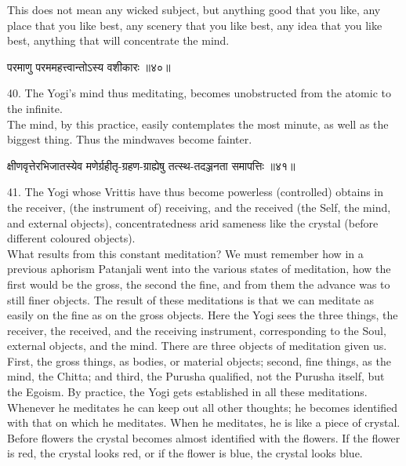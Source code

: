 This does not mean any wicked subject, but anything good that
you like, any place that you like best, any scenery that you like best,
any idea that you like best, anything that will concentrate the mind. \\

\begin{center}
\begin{sanskrit}
परमाणु परममहत्त्वान्तोऽस्य वशीकारः ॥४०॥
\end{sanskrit}
\end{center}
40. The Yogi's mind thus meditating, becomes unobstructed from
the atomic to the infinite. \\

The mind, by this practice, easily contemplates the most
minute, as well as the biggest thing. Thus the mindwaves become
fainter. \\

\begin{center}
\begin{sanskrit}
क्षीणवृत्तेरभिजातस्येव
मणेर्ग्रहीतृ-ग्रहण-ग्राह्येषु
तत्स्थ-तदञ्जनता समापत्तिः ॥४१॥
\end{sanskrit}
\end{center}
41. The Yogi whose Vrittis have thus become powerless
(controlled) obtains in the receiver, (the instrument of) receiving,
and the received (the Self, the mind, and external objects),
concentratedness arid sameness like the crystal (before different
coloured objects). \\

What results from this constant meditation? We must remember
how in a previous aphorism Patanjali went into the various states of
meditation, how the first would be the gross, the second the fine, and
from them the advance was to still finer objects. The result of these
meditations is that we can meditate as easily on the fine as on the
gross objects. Here the Yogi sees the three things, the receiver, the
received, and the receiving instrument, corresponding to the Soul,
external objects, and the mind. There are three objects of meditation
given us. First, the gross things, as bodies, or material objects;
second, fine things, as the mind, the Chitta; and third, the Purusha
qualified, not the Purusha itself, but the Egoism. By practice, the
Yogi gets established in all these meditations. Whenever he meditates
he can keep out all other
thoughts; he becomes identified with that on which he meditates. When
he meditates, he is like a piece of crystal. Before flowers the crystal
becomes almost identified with the flowers. If the flower is red, the
crystal looks red, or if the flower is blue, the crystal looks blue. \\

